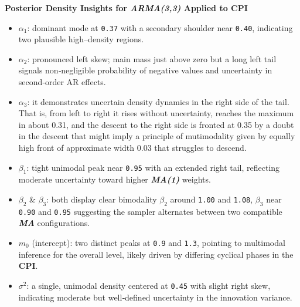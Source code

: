 \documentclass{Configuration_Files/PoliMi3i_thesis}
\begin{document}
\textbf{Posterior Density Insights for \textbf{\textit{ARMA(3,3)}} Applied to CPI}
\begin{itemize}
  \item \(\alpha_1\): dominant mode at \texttt{0.37} with a secondary shoulder near \texttt{0.40}, indicating two plausible high–density regions.
  \item \(\alpha_2\): pronounced left skew; main mass just above zero but a long left tail signals non‐negligible probability of negative values and uncertainty in second‐order AR effects.
  \item \(\alpha_3\): it demonstrates uncertain density dynamics in the right side of the tail. That is, from left to right it rises without uncertainty, reaches the maximum in about 0.31, and the descent to the right side is fronted at 0.35 by a doubt in the descent that might imply a principle of mutimodality given by equally high front of approximate width 0.03 that struggles to descend.
  \item \(\beta_1\): tight unimodal peak near \texttt{0.95} with an extended right tail, reflecting moderate uncertainty toward higher \textbf{\textit{MA(1)}} weights.
  \item \(\beta_2\) \& \(\beta_3\): both display clear bimodality \(\beta_2\) around \texttt{1.00} and \texttt{1.08}, \(\beta_3\) near \texttt{0.90} and \texttt{0.95} suggesting the sampler alternates between two compatible \textbf{\textit{MA}} configurations.
  \item \(m_0\) (intercept): two distinct peaks at \texttt{0.9} and \texttt{1.3}, pointing to multimodal inference for the overall level, likely driven by differing cyclical phases in the \textbf{CPI}.
  \item \(\sigma^2\): a single, unimodal density centered at \texttt{0.45} with slight right skew, indicating moderate but well‐defined uncertainty in the innovation variance.
\end{itemize}


\end{document}
